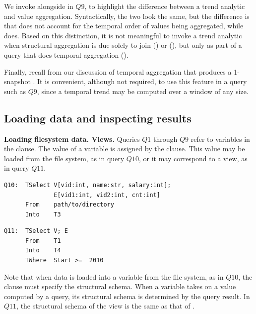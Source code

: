 We invoke  alongside  in $Q9$, to
highlight the difference between a trend analytic and value
aggregation.  Syntactically, the two look the same, but the difference
is that  does not account for the temporal order of
values being aggregated, while  does.  Based on this
distinction, it is not meaningful to invoke a trend analytic when
structural aggregation is due solely to join () or 
(), but only as part of a query that does temporal
aggregation ().

Finally, recall from our discussion of temporal aggregation that
 produces a 1-snapshot \tg.  It is convenient,
although not required, to use this feature in a query such as $Q9$,
since a temporal trend may be computed over a window of any size.

\subsection{Loading data and inspecting results}
\label{sec:example:loadshow}

{\bf Loading filesystem data.  Views.}  Queries $Q1$ through $Q9$
refer to \tg variables in the  clause.  The value of a \tg
variable is assigned by the  clause.  This value may be
loaded from the file system, as in query $Q10$, or it may correspond to
a view, as in query $Q11$.

\begin{small}
\begin{verbatim}
Q10:  TSelect V[vid:int, name:str, salary:int]; 
              E[vid1:int, vid2:int, cnt:int]
      From    path/to/directory
      Into    T3
\end{verbatim}
\end{small}

\begin{small}
\begin{verbatim}
Q11:  TSelect V; E
      From    T1
      Into    T4
      TWhere  Start >=  2010 
\end{verbatim}
\end{small}

Note that when data is loaded into a \tg variable from the file
system, as in $Q10$, the  clause must specify the
structural schema.  When a \tg variable takes on a value computed by a
query, its structural schema is determined by the query result.  In
$Q11$, the structural schema of the view  is the same as
that of .

